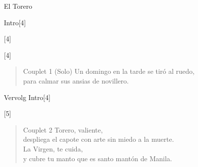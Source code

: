 \begin{song}{El Torero}

\begin{instrumental}{Intro}[4]
 
\end{instrumental}
\begin{instrumental}{}[4]
 \measure{} \measure{} \measure{}
 \measure{}  \measure{}
 \measure{} \measure{} \measure{}
 \measure{} \measure{} \measure{}
\measure{} \measure{}  \measure{}
 \measure{} \measure*{}
\end{instrumental}
\begin{instrumental}{}[4]
 
 
\end{instrumental}

\begin{verse}{Couplet 1 \textnormal{(Solo)}}
 Un domingo en la tarde  se tiró al  ruedo,\\
para calmar sus ansias  de novillero.
\end{verse}

\begin{instrumental}{Vervolg Intro}[4]
 
 
\end{instrumental}
\begin{instrumental}{}[5]
 \measure{} \measure{}  
\end{instrumental}

\begin{verse}{Couplet 2}
Torero, valiente,\\
despliega el capote con arte sin miedo a la muerte. \\
La Virgen, te cuida,\\
y cubre tu manto que es santo mantón de Manila. 
\end{verse}


\end{song}
